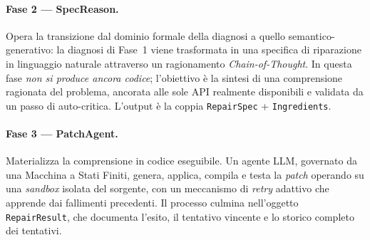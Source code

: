 \paragraph{Fase 2 --- SpecReason.} Opera la transizione dal dominio formale della diagnosi a quello
semantico-generativo: la diagnosi di Fase~1 viene trasformata in una specifica di riparazione in
linguaggio naturale attraverso un ragionamento \textit{Chain-of-Thought}. In questa fase
\textit{non si produce ancora codice}; l'obiettivo è la sintesi di una comprensione ragionata del problema,
ancorata alle sole API realmente disponibili e validata da un passo di auto-critica. L'output è la coppia
\texttt{RepairSpec} + \texttt{Ingredients}.

\paragraph{Fase 3 --- PatchAgent.} Materializza la comprensione in codice eseguibile. Un agente LLM,
governato da una Macchina a Stati Finiti, genera, applica, compila e testa la \textit{patch} operando
su una \textit{sandbox} isolata del sorgente, con un meccanismo di \textit{retry} adattivo che apprende
dai fallimenti precedenti. Il processo culmina nell'oggetto \texttt{RepairResult}, che documenta l'esito,
il tentativo vincente e lo storico completo dei tentativi.